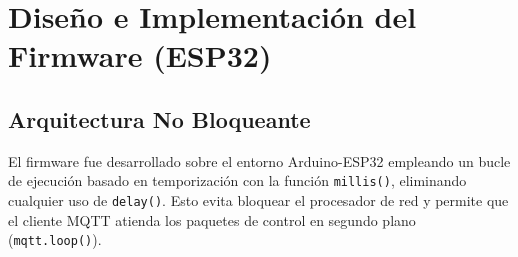 \documentclass[11pt,a4paper]{article}
\begin{document}
\section{Diseño e Implementación del Firmware (ESP32)}

\subsection{Arquitectura No Bloqueante}
El firmware fue desarrollado sobre el entorno Arduino-ESP32 empleando un bucle de ejecución basado en temporización con la función \texttt{millis()}, eliminando cualquier uso de \texttt{delay()}. Esto evita bloquear el procesador de red y permite que el cliente MQTT atienda los paquetes de control en segundo plano (\texttt{mqtt.loop()}).
\end{document}
